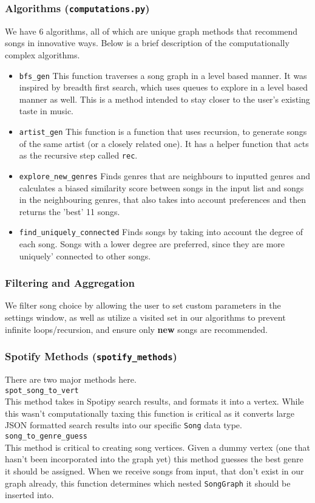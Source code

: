 \documentclass[fontsize=11pt]{article}
\begin{document}
    \subsubsection*{Algorithms (\texttt{computations.py})}

    We have 6 algorithms, all of which are unique graph methods that recommend songs in innovative ways. Below is a brief description of the computationally complex algorithms.
    \begin{itemize}
        \item \texttt{bfs\_gen}
        This function traverses a song graph in a level based manner. It was inspired by breadth first search, which uses queues to explore in a level based manner as well. This is a method intended to stay closer to the user's existing taste in music.
        \item \texttt{artist\_gen}
        This function is a function that uses recursion, to generate songs of the same artist (or a closely related one). It has a helper function that acts as the recursive step called \texttt{rec}.
        \item \texttt{explore\_new\_genres}
        Finds genres that are neighbours to inputted genres and calculates a biased similarity score between songs in the input list and songs in the neighbouring genres, that also takes into account preferences and then returns the 'best' 11 songs.
        \item \texttt{find\_uniquely\_connected}
        Finds songs by taking into account the degree of each song. Songs with a lower degree are preferred, since they are more uniquely' connected to other songs.
    \end{itemize}

    \subsubsection*{Filtering and Aggregation}
    We filter song choice by allowing the user to set custom parameters in the settings window, as well as utilize a visited set in our algorithms to prevent infinite loops/recursion, and ensure only \textbf{new} songs are recommended.
    \subsubsection*{Spotify Methods (\texttt{spotify\_methods})}
    There are two major methods here. \\
    \noindent \texttt{spot\_song\_to\_vert} \\
    This method takes in Spotipy search results, and formats it into a vertex. While this wasn't computationally taxing this function is critical as it converts large JSON formatted search results into our specific \texttt{Song} data type. \\
    \noindent \texttt{song\_to\_genre\_guess} \\
    This method is critical to creating song vertices. Given a dummy vertex (one that hasn't been incorporated into the graph yet) this method guesses the best genre it should be assigned. When we receive songs from input, that don't exist in our graph already, this function determines which nested \texttt{SongGraph} it should be inserted into.
\end{document}

